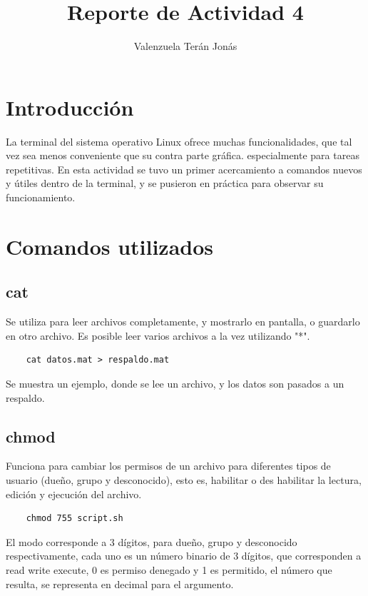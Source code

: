 \documentclass[a4paper]{article}
\title{Reporte de Actividad 4}
\author{Valenzuela Terán Jonás}
\begin{document}
\maketitle

\section*{Introducción}
La terminal del sistema operativo Linux ofrece muchas funcionalidades, que tal vez sea menos conveniente que su contra parte gráfica. especialmente para tareas repetitivas. En esta actividad se tuvo un primer acercamiento a comandos 	nuevos y útiles dentro de la terminal, y se pusieron en práctica para observar su funcionamiento.

\section*{Comandos utilizados}

\subsection*{cat}

Se utiliza para leer archivos completamente, y mostrarlo en pantalla, o guardarlo en otro archivo. Es posible leer varios archivos a la vez utilizando "*". 

\begin{verbatim}
	cat datos.mat > respaldo.mat
\end{verbatim}

Se muestra un ejemplo, donde se lee un archivo, y los datos son pasados a un respaldo.


\subsection*{chmod}

Funciona para cambiar los permisos de un archivo para diferentes tipos de usuario (dueño, grupo y desconocido), esto es, habilitar o des habilitar la lectura, edición y ejecución del archivo.

\begin{verbatim}
	chmod 755 script.sh
\end{verbatim}

El modo corresponde a 3 dígitos, para dueño, grupo y desconocido respectivamente, cada uno es un número binario de 3 dígitos, que corresponden a read write execute, 0 es permiso denegado y 1 es permitido, el número que resulta, se representa en decimal para el argumento.
\end{document}
